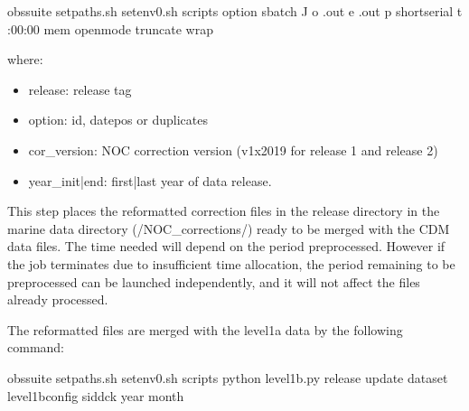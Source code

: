 \documentclass[letterpaper,10pt,english]{sphinxmanual}
\begin{document}
\begin{sphinxVerbatim}[commandchars=\\\{\}]
 obs\PYGZhy{}suite
 setpaths.sh
 setenv0.sh
 scripts
option
sbatch \PYGZhy{}J  \PYGZhy{}o .out \PYGZhy{}e .out \PYGZhy{}p short\PYGZhy{}serial \PYGZhy{}t :00:00 \PYGZhy{}\PYGZhy{}mem  \PYGZhy{}\PYGZhy{}open\PYGZhy{}mode truncate \PYGZhy{}\PYGZhy{}wrap
\end{sphinxVerbatim}

where:
\begin{itemize}
\item {}
release: release tag

\item {}
option: id, datepos or duplicates

\item {}
cor\_version: NOC correction version (v1x2019 for release 1 and release 2)

\item {}
year\_init|end: first|last year of data release.

\end{itemize}

This step places the reformatted correction files in the release directory in
the marine data directory (/NOC\_corrections/) ready to be
merged with the CDM data files. The time needed will depend on the period
pre\sphinxhyphen{}processed. However if the job terminates due to insufficient time allocation,
the period remaining to be pre\sphinxhyphen{}processed can be launched independently, and it
will not affect the files already processed.

The reformatted files are merged with the level1a data by the following command:

\begin{sphinxVerbatim}[commandchars=\\\{\}]
 obs\PYGZhy{}suite
 setpaths.sh
 setenv0.sh
 scripts
python level1b.py  release update dataset level1b\PYGZus{}config sid\PYGZhy{}dck year month
\end{sphinxVerbatim}
\end{document}
